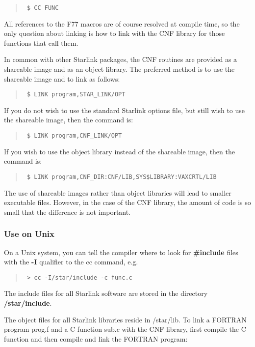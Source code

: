 \begin{quote}{\tt
\$ CC FUNC
}
\end{quote}

All references to the F77 macros are of course resolved at compile time, so the
only question about linking is how to link with the CNF library for those
functions that call them.

In common with other Starlink packages, the CNF routines are provided as a
shareable image and as an object library. The preferred method is to use the
shareable image and to link as follows:

\begin{quote}{\tt
\$ LINK program,STAR\_LINK/OPT
}
\end{quote}

If you do not wish to use the standard Starlink options file, but still wish to
use the shareable image, then the command is:

\begin{quote}{\tt
\$ LINK program,CNF\_LINK/OPT
}
\end{quote}

If you wish to use the object library instead of the shareable image, then the
command is:

\begin{quote}{\tt
\$ LINK program,CNF\_DIR:CNF/LIB,SYS\$LIBRARY:VAXCRTL/LIB
}
\end{quote}

The use of shareable images rather than object libraries will lead to smaller
executable files. However, in the case of the CNF library, the amount of code
is so small that the difference is not important.

\subsubsection{Use on Unix}

On a Unix system, you can tell the compiler where to look for {\bf \#include}
files with the {\bf -I} qualifier to the cc command, e.g.

\begin{quote}{\tt
> cc -I/star/include -c func.c
}
\end{quote}

The include files for all Starlink software are stored in the
directory {\bf /star/include}.

The object files for all Starlink libraries reside in /star/lib. To link a
FORTRAN program prog.f and a C function sub.c with the CNF library, first
compile the C function and then compile and link the FORTRAN program:

